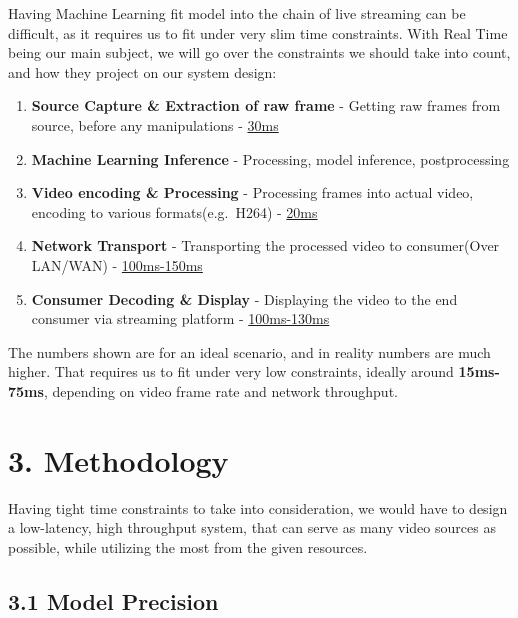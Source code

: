 \documentclass[
]{article}
\providecommand{\tightlist}{%
  \setlength{\itemsep}{0pt}\setlength{\parskip}{0pt}}
\begin{document}
Having Machine Learning fit model into the chain of live streaming can
be difficult, as it requires us to fit under very slim time constraints.
\newline With Real Time being our main subject, we will go over the
constraints we should take into count, and how they project on our
system design:

\begin{enumerate}
\def\labelenumi{\arabic{enumi}.}
\tightlist
\item
  \textbf{Source Capture \& Extraction of raw frame} - Getting raw
  frames from source, before any manipulations - \underline{30ms}
  \newline
\item
  \textbf{Machine Learning Inference} - Processing, model inference,
  postprocessing \newline
\item
  \textbf{Video encoding \& Processing} - Processing frames into actual
  video, encoding to various formats(e.g.~H264) - \underline{20ms}
  \newline
\item
  \textbf{Network Transport} - Transporting the processed video to
  consumer(Over LAN/WAN) - \underline{100ms-150ms} \newline
\item
  \textbf{Consumer Decoding \& Display} - Displaying the video to the
  end consumer via streaming platform - \underline{100ms-130ms}
\end{enumerate}

The numbers shown are for an ideal scenario, and in reality numbers are
much higher. That requires us to fit under very low constraints, ideally
around \textbf{15ms-75ms}, depending on video frame rate and network
throughput. \newpage{}

\section{3. Methodology}\label{methodology}

Having tight time constraints to take into consideration, we would have
to design a low-latency, high throughput system, that can serve as many
video sources as possible, while utilizing the most from the given
resources.

\subsection{3.1 Model Precision}\label{model-precision}
\end{document}
